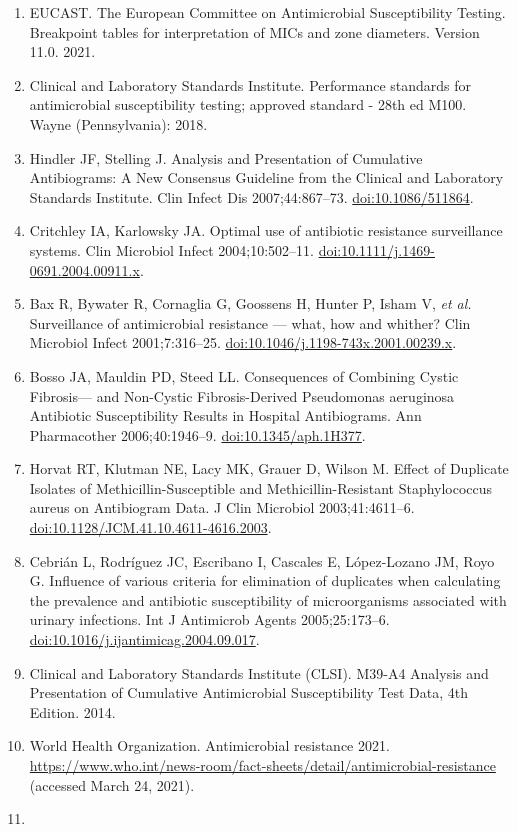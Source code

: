 \documentclass[
]{book}
\begin{document}
\begin{enumerate}
\item
  EUCAST. The European Committee on Antimicrobial Susceptibility Testing. Breakpoint tables for interpretation of MICs and zone diameters. Version 11.0. 2021.
\item
  Clinical and Laboratory Standards Institute. Performance standards for antimicrobial susceptibility testing; approved standard - 28th ed M100. Wayne (Pennsylvania): 2018.
\item
  Hindler JF, Stelling J. Analysis and Presentation of Cumulative Antibiograms: A New Consensus Guideline from the Clinical and Laboratory Standards Institute. Clin Infect Dis 2007;44:867--73. \url{doi:10.1086/511864}.
\item
  Critchley IA, Karlowsky JA. Optimal use of antibiotic resistance surveillance systems. Clin Microbiol Infect 2004;10:502--11. \url{doi:10.1111/j.1469-0691.2004.00911.x}.
\item
  Bax R, Bywater R, Cornaglia G, Goossens H, Hunter P, Isham V, \emph{et al.} Surveillance of antimicrobial resistance --- what, how and whither? Clin Microbiol Infect 2001;7:316--25. \url{doi:10.1046/j.1198-743x.2001.00239.x}.
\item
  Bosso JA, Mauldin PD, Steed LL. Consequences of Combining Cystic Fibrosis--- and Non-Cystic Fibrosis-Derived Pseudomonas aeruginosa Antibiotic Susceptibility Results in Hospital Antibiograms. Ann Pharmacother 2006;40:1946--9. \url{doi:10.1345/aph.1H377}.
\item
  Horvat RT, Klutman NE, Lacy MK, Grauer D, Wilson M. Effect of Duplicate Isolates of Methicillin-Susceptible and Methicillin-Resistant Staphylococcus aureus on Antibiogram Data. J Clin Microbiol 2003;41:4611--6. \url{doi:10.1128/JCM.41.10.4611-4616.2003}.
\item
  Cebrián L, Rodríguez JC, Escribano I, Cascales E, López-Lozano JM, Royo G. Influence of various criteria for elimination of duplicates when calculating the prevalence and antibiotic susceptibility of microorganisms associated with urinary infections. Int J Antimicrob Agents 2005;25:173--6. \url{doi:10.1016/j.ijantimicag.2004.09.017}.
\item
  Clinical and Laboratory Standards Institute (CLSI). M39-A4 Analysis and Presentation of Cumulative Antimicrobial Susceptibility Test Data, 4th Edition. 2014.
\item
  World Health Organization. Antimicrobial resistance 2021. \url{https://www.who.int/news-room/fact-sheets/detail/antimicrobial-resistance} (accessed March 24, 2021).
\item

\end{enumerate}
\end{document}
